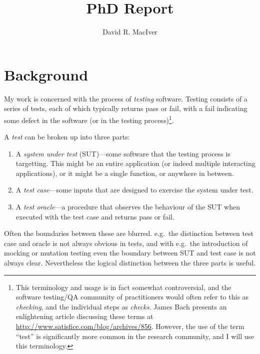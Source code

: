 

\title{PhD Report}
\author{David R. MacIver}



\maketitle

\tableofcontents

\chapter{Background}\label{chap:introduction}

My work is concerned with the process of \emph{testing} software.
Testing consists of a series of tests,
each of which typically returns pass or fail,
with a fail indicating some defect in the software (or in the testing process)\footnote{
This terminology and usage is in fact somewhat controversial,
and the software testing/QA community of practitioners would often refer to this as \emph{checking},
and the individual steps as \emph{checks}.
James Bach presents an enlightening article discussing these terms at \url{http://www.satisfice.com/blog/archives/856}.
However,
the use of the term ``test'' is significantly more common in the research community,
and I will use this terminology.
}.

A \emph{test} can be broken up into three parts:

\begin{enumerate}
\item A \emph{system under test} (SUT)---some software that the testing process is targetting.
This might be an entire application (or indeed multiple interacting applications),
or it might be a single function,
or anywhere in between.
\item A \emph{test case}---some
inputs that are designed to exercise the system under test.
\item A \emph{test oracle}---a
procedure that observes the behaviour of the SUT when executed with the test case and returns pass or fail.
\end{enumerate}

Often the boundaries between these are blurred.
e.g.\ the distinction between test case and oracle is not always obvious in tests,
and with e.g.\ the introduction of mocking or mutation testing even the boundary between SUT and test case is not always clear.
Nevertheless the logical distinction between the three parts is useful.


